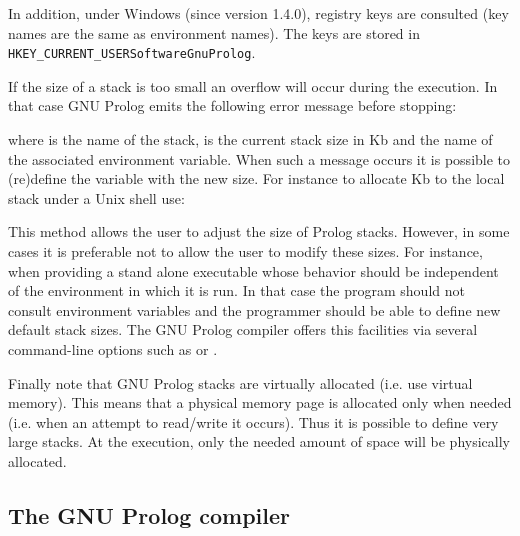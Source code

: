 In addition, under Windows (since version 1.4.0), registry keys are consulted
(key names are the same as environment names). The keys are stored in
\texttt{HKEY\_CURRENT\_USER{\bs}Software{\bs}GnuProlog{\bs}}.

If the size of a stack is too small an overflow will occur during the
execution. In that case GNU Prolog emits the following error message before
stopping:


where  is the name of the stack,  is
the current stack size in Kb and  the name of the
associated environment variable. When such a message occurs it is possible
to (re)define the variable  with the new size. For
instance to allocate  Kb to the local stack under a Unix shell use:

\begin{CodeTwoCols}[6cm]
\end{CodeTwoCols}

This method allows the user to adjust the size of Prolog stacks. However, in
some cases it is preferable not to allow the user to modify these sizes. For
instance, when providing a stand alone executable whose behavior should be
independent of the environment in which it is run. In that case the program
should not consult environment variables and the programmer should be able
to define new default stack sizes. The GNU Prolog compiler offers this
facilities via several command-line options such as  or
 .

Finally note that GNU Prolog stacks are virtually allocated (i.e. use virtual
memory). This means that a physical memory page is allocated only when needed
(i.e. when an attempt to read/write it occurs). Thus it is possible to define
very large stacks. At the execution, only the needed amount of space will be
physically allocated.

\subsection{The GNU Prolog compiler}
\label{The-GNU-Prolog-compiler}

